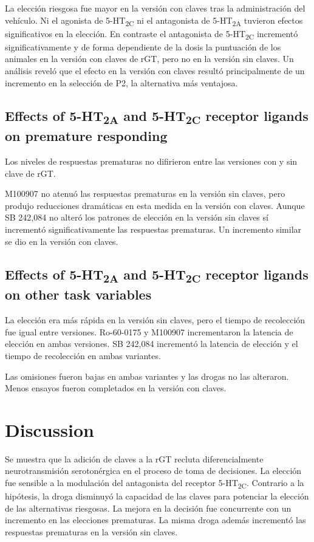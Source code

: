 \documentclass[a4paper,12pt]{article}
\begin{document}
La elección riesgosa fue mayor en la versión con claves tras la administración del vehículo. Ni el agonista de 5-HT\textsubscript{2C} ni el antagonista de 5-HT\textsubscript{2A} tuvieron efectos significativos en la elección. En contraste el antagonista de 5-HT\textsubscript{2C} incrementó significativamente y de forma dependiente de la dosis la puntuación de los animales en la versión con claves de rGT, pero no en la versión sin claves. Un análisis reveló que el efecto en la versión con claves resultó principalmente de un incremento en la selección de P2, la alternativa más ventajosa.

\subsection{Effects of 5-HT\textsubscript{2A} and 5-HT\textsubscript{2C} receptor ligands on premature responding}

Los niveles de respuestas prematuras no difirieron entre las versiones con y sin clave de rGT.

M100907 no atenuó las respuestas prematuras en la versión sin claves, pero produjo reducciones dramáticas en esta medida en la versión con claves. Aunque SB 242,084 no alteró los patrones de elección en la versión sin claves sí incrementó significativamente las respuestas prematuras. Un incremento similar se dio en la versión con claves.

\subsection{Effects of 5-HT\textsubscript{2A} and 5-HT\textsubscript{2C} receptor ligands on other task variables}

La elección era más rápida en la versión sin claves, pero el tiempo de recolección fue igual entre versiones. Ro-60-0175 y M100907 incrementaron la latencia de elección en ambas versiones. SB 242,084 incrementó la latencia de elección y el tiempo de recolección en ambas variantes.

Las omisiones fueron bajas en ambas variantes y las drogas no las alteraron. Menos ensayos fueron completados en la versión con claves.

\section{Discussion}

Se muestra que la adición de claves a la rGT recluta diferencialmente neurotransmisión serotonérgica en el proceso de toma de decisiones. La elección fue sensible a la modulación del antagonista del receptor 5-HT\textsubscript{2C}. Contrario a la hipótesis, la droga disminuyó la capacidad de las claves para potenciar la elección de las alternativas riesgosas. La mejora en la decisión fue concurrente con un incremento en las elecciones prematuras. La misma droga además incrementó las respuestas prematuras en la versión sin claves.
\end{document}
